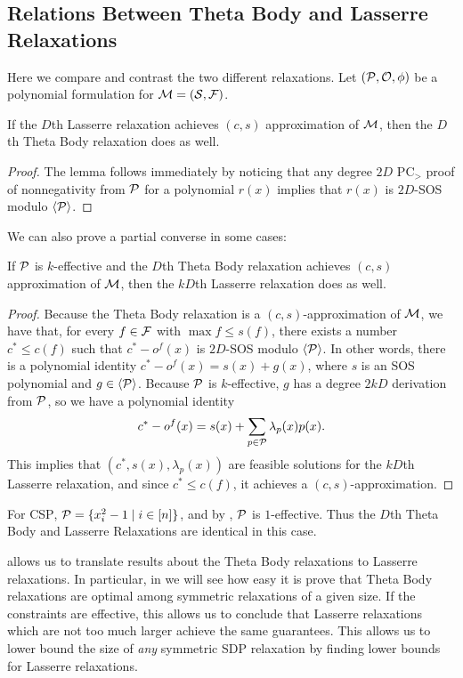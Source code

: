 \subsection{Relations Between Theta Body and Lasserre Relaxations}
Here we compare and contrast the two different relaxations. Let $(\mathcal P, \mathcal O, \phi)$ be a polynomial formulation for $\mathcal M = (\mathcal S, \mathcal F)$. 
\begin{lemma}
If the $D$th Lasserre relaxation achieves $(c,s)$ approximation of $\mathcal M$, then the $D$th Theta Body relaxation does as well. 
\end{lemma}
\begin{proof}
The lemma follows immediately by noticing that any degree $2D$ PC$_>$ proof of nonnegativity from $\mathcal P$ for a polynomial $r(x)$ implies that $r(x)$ is $2D$-SOS modulo $\langle \mathcal P \rangle$. 
\end{proof}
We can also prove a partial converse in some cases:
\begin{proposition}\label{prop:tb_to_sos}
If $\mathcal P$ is $k$-effective and the $D$th Theta Body relaxation achieves $(c,s)$ approximation of $\mathcal M$, then the $kD$th Lasserre relaxation does as well.
\end{proposition}
\begin{proof}
Because the Theta Body relaxation is a $(c,s)$-approximation of $\mathcal M$, we have that, for every $f \in \mathcal F$ with $\max f \leq s(f)$, there exists a number $c^* \leq c(f)$ such that $c^* - o^f(x)$ is $2D$-SOS modulo $\langle \mathcal P \rangle$. In other words, there is a polynomial identity $c^* - o^f(x) = s(x) + g(x)$, where $s$ is an SOS polynomial and $g \in \langle \mathcal P \rangle$. Because $\mathcal P$ is $k$-effective, $g$ has a degree $2kD$ derivation from $\mathcal P$, so we have a polynomial identity
\[c^* - o^f(x) = s(x) + \sum_{p \in \mathcal P} \lambda_p(x)p(x).\]
This implies that $(c^*, s(x), \lambda_p(x))$ are feasible solutions for the $kD$th Lasserre relaxation, and since $c^* \leq c(f)$, it achieves a $(c,s)$-approximation.
\end{proof}
\begin{example}
For \textsc{CSP}, $\mathcal P = \{x_i^2 - 1 \mid i \in [n]\}$, and by , $\mathcal P$ is $1$-effective. Thus the $D$th Theta Body and Lasserre Relaxations are identical in this case.
\end{example}
 allows us to translate results about the Theta Body relaxations to Lasserre relaxations. In particular, in  we will see how easy it is prove that Theta Body relaxations are optimal among symmetric relaxations of a given size. If the constraints are effective, this allows us to conclude that Lasserre relaxations which are not too much larger achieve the same guarantees. This allows us to lower bound the size of \emph{any} symmetric SDP relaxation by finding lower bounds for Lasserre relaxations. 

